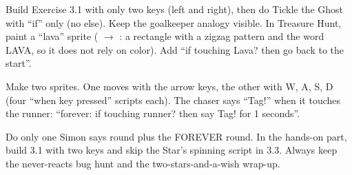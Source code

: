 \begin{differentiation}
\supportpath Build Exercise 3.1 with only two keys (left and right), then do Tickle the Ghost with \enquote{if} only (no else). Keep the goalkeeper analogy visible.
\extensionpath In Treasure Hunt, paint a \enquote{lava} sprite ( $\rightarrow$ : a rectangle with a zigzag pattern and the word LAVA, so it does not rely on color). Add \enquote{if touching Lava? then go back to the start}.
\end{differentiation}

\begin{stretchchallenge}
Make two sprites. One moves with the arrow keys, the other with W, A, S, D (four \enquote{when key pressed} scripts each). The chaser says \enquote{Tag!} when it touches the runner: \enquote{forever: if touching runner? then say Tag! for 1 seconds}.
\end{stretchchallenge}

\begin{teachernote}
Do only one Simon says round plus the FOREVER round. In the hands-on part, build 3.1 with two keys and skip the Star's spinning script in 3.3. Always keep the never-reacts bug hunt and the two-stars-and-a-wish wrap-up.
\end{teachernote}
